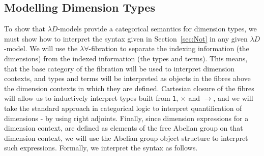 \documentclass[a4paper,UKenglish]{lipics}
\newcommand{\msf}[1]{\mathsf{#1}} %
\newcommand{\unitTy}{\msf{1}}
\begin{document}
\subsection{Modelling Dimension Types}
To show that $\lambda D$-models provide a categorical semantics for dimension types, we must show how to interpret the syntax given in Section~\ref{sec:Not} in any given $\lambda D$-model. We will use the $\lambda \forall$-fibration to separate the indexing information (the dimensions) from the indexed information (the types and terms). This means, that the base category of the fibration will be used to interpret dimension contexts, and types and terms will be interpreted as objects in the fibres above the dimension contexts in which they are defined. Cartesian closure of the fibres will allow us to inductively interpret types built from $\unitTy$, $\times$ and $\rightarrow$, and we will take the standard approach in categorical logic to interpret quantification of dimensions - by using right adjoints. Finally, since dimension expressions for a dimension context, are defined as elements of the free Abelian group on that dimension context, we will use the Abelian group object structure to interpret
such expressions. Formally, we interpret the syntax as follows.
\end{document}
